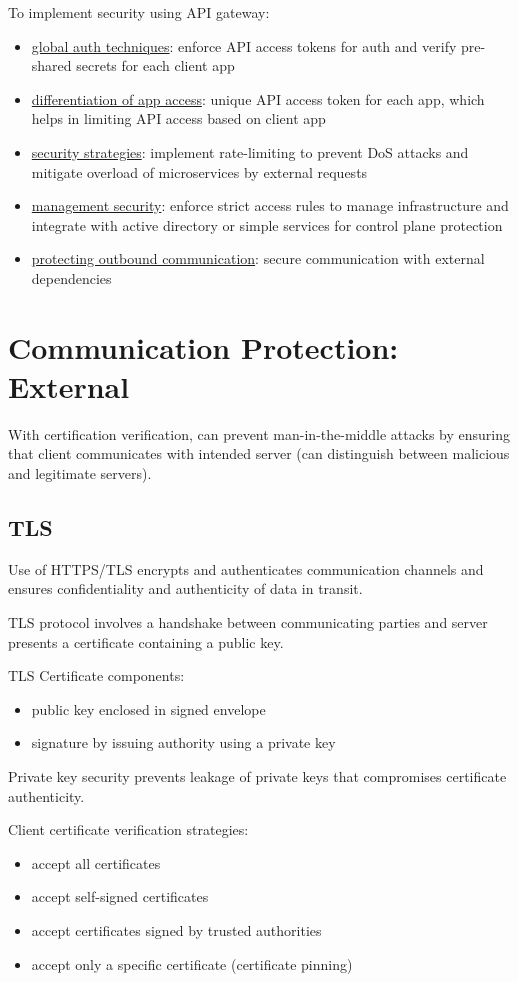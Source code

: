 \documentclass[11pt]{article}
\begin{document}
To implement security using API gateway:
\begin{itemize}
\item \uline{global auth techniques}: enforce API access tokens for
auth and verify pre-shared secrets for each client app
\item \uline{differentiation of app access}: unique API access token
for each app, which helps in limiting API access based on
client app
\item \uline{security strategies}: implement rate-limiting to prevent
DoS attacks and mitigate overload of microservices by external
requests
\item \uline{management security}: enforce strict access rules to manage
infrastructure and integrate with active directory or simple
services for control plane protection
\item \uline{protecting outbound communication}: secure communication with
external dependencies
\end{itemize}
\section{Communication Protection: External}
\label{sec:org38910d0}
With certification verification, can prevent man-in-the-middle
attacks by ensuring that client communicates with intended server
(can distinguish between malicious and legitimate servers).
\subsection{TLS}
\label{sec:org6af8eed}
Use of HTTPS/TLS encrypts and authenticates communication channels
and ensures confidentiality and authenticity of data in transit.

TLS protocol involves a handshake between communicating parties and server
presents a certificate containing a public key.

TLS Certificate components:
\begin{itemize}
\item public key enclosed in signed envelope
\item signature by issuing authority using a private key
\end{itemize}

Private key security prevents leakage of private keys that compromises
certificate authenticity.

Client certificate verification strategies:
\begin{itemize}
\item accept all certificates
\item accept self-signed certificates
\item accept certificates signed by trusted authorities
\item accept only a specific certificate (certificate pinning)
\end{itemize}
\end{document}
